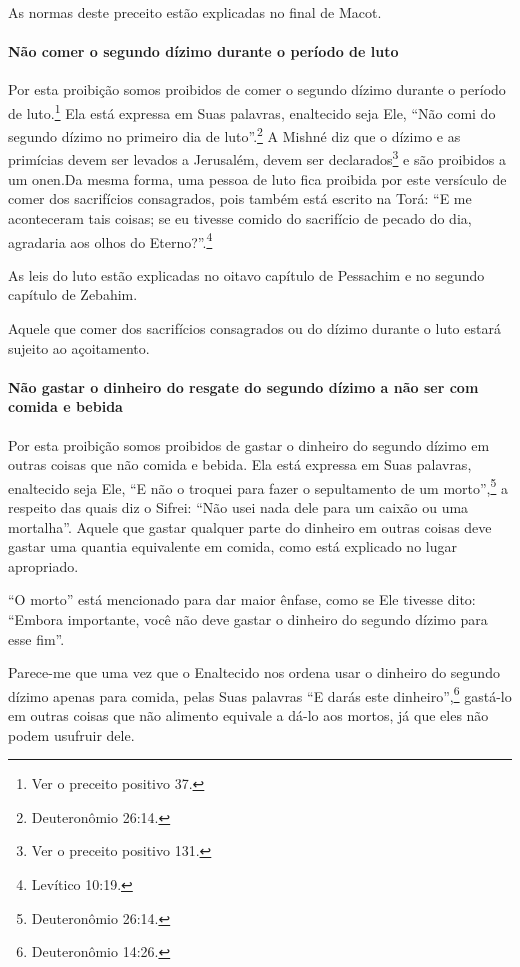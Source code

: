 As normas deste preceito estão explicadas no final de Macot.

\paragraph{Não comer o segundo dízimo durante o período de luto}

Por esta proibição somos proibidos de comer o segundo dízimo durante o
período de luto.\footnote{Ver o preceito positivo 37.} Ela está expressa em Suas
palavras, enaltecido seja Ele, ``Não comi do segundo dízimo no primeiro
dia de luto''.\footnote{Deuteronômio 26:14.} A Mishné diz que o dízimo e as
primícias devem ser levados a Jerusalém, devem ser
declarados\footnote{Ver o preceito positivo 131.} e são proibidos a um onen.\starr Da mesma forma, uma pessoa de luto fica
proibida por este versículo de comer dos sacrifícios consagrados, pois
também está escrito na Torá: ``E me aconteceram tais coisas; se eu
tivesse comido do sacrifício de pecado do dia, agradaria aos olhos do
Eterno?''.\footnote{Levítico 10:19.}

As leis do luto estão explicadas no oitavo capítulo de Pessachim e no
segundo capítulo de Zebahim.

Aquele que comer dos sacrifícios consagrados ou do dízimo durante o
luto estará sujeito ao açoitamento.

\paragraph{Não gastar o dinheiro do resgate do segundo dízimo a não ser com
comida e bebida}

Por esta proibição somos proibidos de gastar o dinheiro do segundo
dízimo em outras coisas que não comida e bebida. Ela está expressa em
Suas palavras, enaltecido seja Ele, ``E não o troquei para fazer o
sepultamento de um morto'',\footnote{Deuteronômio 26:14.} a respeito das quais
diz o Sifrei: ``Não usei nada dele para um caixão ou uma mortalha''.
Aquele que gastar qualquer parte do dinheiro em outras coisas deve
gastar uma quantia equivalente em comida, como está explicado no lugar
apropriado.

``O morto'' está mencionado para dar maior ênfase, como se Ele tivesse
dito: ``Embora importante, você não deve gastar o dinheiro do segundo
dízimo para esse fim''.

Parece-me que uma vez que o Enaltecido nos ordena usar o dinheiro do
segundo dízimo apenas para comida, pelas Suas palavras ``E darás este
dinheiro'',\footnote{Deuteronômio 14:26.} gastá-lo em outras coisas que não
alimento equivale a dá-lo aos mortos, já que eles não podem usufruir
dele.

